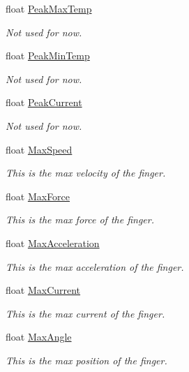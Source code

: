 \begin{DoxyCompactItemize}
float \hyperlink{struct_finger_ac959db1d35ebd3ded1ba2639cb927fbc}{Peak\+Max\+Temp}
\begin{DoxyCompactList}\small\item\em Not used for now. \end{DoxyCompactList}\item 
float \hyperlink{struct_finger_ada7e63fa8e1b618d198cafd472692185}{Peak\+Min\+Temp}
\begin{DoxyCompactList}\small\item\em Not used for now. \end{DoxyCompactList}\item 
float \hyperlink{struct_finger_a1a0e3b38fbeac4a9805448504e1cd537}{Peak\+Current}
\begin{DoxyCompactList}\small\item\em Not used for now. \end{DoxyCompactList}\item 
float \hyperlink{struct_finger_a66da8cea127f215c614fdb87e0ef2b9c}{Max\+Speed}
\begin{DoxyCompactList}\small\item\em This is the max velocity of the finger. \end{DoxyCompactList}\item 
float \hyperlink{struct_finger_aac1ffdc3d2b9d2cd23d90b76e39e892c}{Max\+Force}
\begin{DoxyCompactList}\small\item\em This is the max force of the finger. \end{DoxyCompactList}\item 
float \hyperlink{struct_finger_a383fb587571f0e8b6bc1713499973763}{Max\+Acceleration}
\begin{DoxyCompactList}\small\item\em This is the max acceleration of the finger. \end{DoxyCompactList}\item 
float \hyperlink{struct_finger_a0ee68473cfae080e2ab4140ae28831ce}{Max\+Current}
\begin{DoxyCompactList}\small\item\em This is the max current of the finger. \end{DoxyCompactList}\item 
float \hyperlink{struct_finger_a1e03293d942b0d44d937b21769192d2a}{Max\+Angle}
\begin{DoxyCompactList}\small\item\em This is the max position of the finger. \end{DoxyCompactList}\item 

\end{DoxyCompactItemize}
